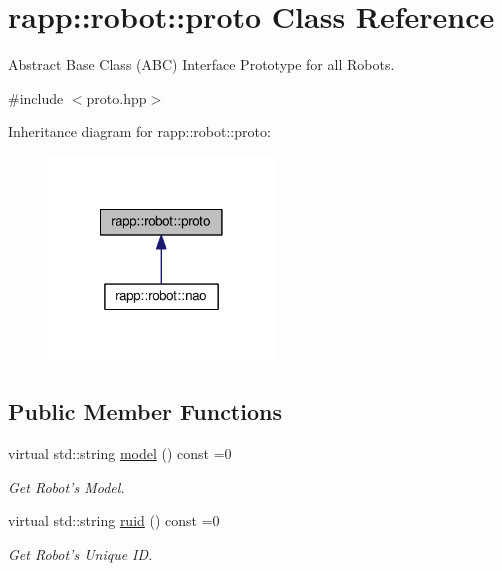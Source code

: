 \hypertarget{classrapp_1_1robot_1_1proto}{\section{rapp\-:\-:robot\-:\-:proto Class Reference}
\label{classrapp_1_1robot_1_1proto}
}


Abstract Base Class (A\-B\-C) Interface Prototype for all Robots.  




{\ttfamily \#include $<$proto.\-hpp$>$}



Inheritance diagram for rapp\-:\-:robot\-:\-:proto\-:
\nopagebreak
\begin{figure}[H]
\begin{center}
\leavevmode
\includegraphics[width=170pt]{classrapp_1_1robot_1_1proto__inherit__graph}
\end{center}
\end{figure}
\subsection*{Public Member Functions}
\begin{DoxyCompactItemize}
\item 
virtual std\-::string \hyperlink{classrapp_1_1robot_1_1proto_ace501b12c79698041f37a90306163aa9}{model} () const =0
\begin{DoxyCompactList}\small\item\em Get Robot's Model. \end{DoxyCompactList}\item 
virtual std\-::string \hyperlink{classrapp_1_1robot_1_1proto_a2d0dd7d28350e8a7c6ffb7616c0a6f5f}{ruid} () const =0
\begin{DoxyCompactList}\small\item\em Get Robot's Unique I\-D. \end{DoxyCompactList}\end{DoxyCompactItemize}


